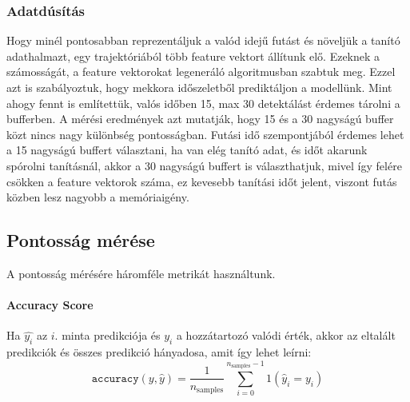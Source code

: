 \documentclass[acmtog, authorversion]{acmart}
\begin{document}
\subsubsection{Adatdúsítás}
Hogy minél pontosabban reprezentáljuk a valód idejű futást és növeljük a tanító adathalmazt, egy trajektóriából több feature vektort állítunk elő.
Ezeknek a számosságát, a feature vektorokat legeneráló algoritmusban szabtuk meg. Ezzel azt is szabályoztuk, hogy mekkora időszeletből prediktáljon
a modellünk. Mint ahogy fennt is említettük, valós időben 15, max 30 detektálást érdemes tárolni a bufferben. A mérési eredmények azt mutatják, hogy
15 és a 30 nagyságú buffer közt nincs nagy különbség pontosságban. Futási idő szempontjából érdemes lehet a 15 nagyságú buffert választani,
ha van elég tanító adat, és időt akarunk spórolni tanításnál, akkor a 30 nagyságú buffert is választhatjuk, mivel így felére csökken a feature vektorok száma, ez kevesebb tanítási időt jelent, viszont futás közben lesz nagyobb a memóriaigény.
\subsection{Pontosság mérése}
A pontosság mérésére háromféle metrikát használtunk.
\paragraph{Accuracy Score}
Ha \begin{math}\hat{y_i}\end{math} az \begin{math}i\end{math}. minta predikciója és \begin{math}y_i\end{math} a hozzátartozó valódi érték,
akkor az eltalált predikciók és összes predikció hányadosa, amit így lehet leírni:\break
\begin{equation}
\texttt{accuracy}(y, \hat{y}) = \frac{1}{n_\text{samples}} \sum_{i=0}^{n_\text{samples}-1} 1(\hat{y}_i = y_i)
\end{equation}
\end{document}
